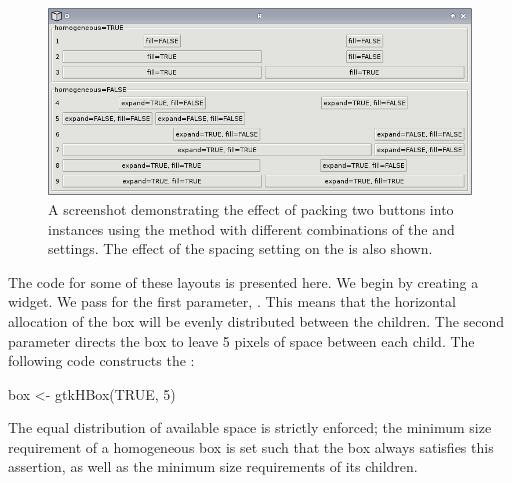 \begin{figure}[h!tbp]
  \begin{center}
    \includegraphics{packing.png}
    \caption{\label{fig:packing}A screenshot demonstrating the effect
      of packing two buttons into  instances using the
       method with different combinations of
      the  and
       settings.  The effect of the
       spacing setting on the
       is also shown.}
  \end{center}
\end{figure}

The code for some of these layouts is presented here. We begin by
creating a  widget. We pass  for the first
parameter, . This means that the
horizontal allocation of the box will be evenly distributed between
the children.  The second parameter directs the box to leave 5 pixels
of space between each child.  The following code constructs the
:
\begin{Schunk}
\begin{Sinput}
 box <- gtkHBox(TRUE, 5)
\end{Sinput}
\end{Schunk}
The equal distribution of available space is strictly enforced; the
minimum size requirement of a homogeneous box is set such that the box
always satisfies this assertion, as well as the minimum size
requirements of its children.

